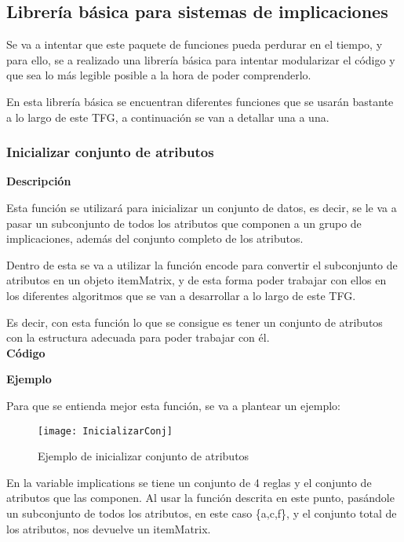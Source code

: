 \subsection{Librer\'ia b\'asica para sistemas de implicaciones}
Se va a intentar que este paquete de funciones pueda perdurar en el tiempo, y para ello, 
se a realizado una librer\'ia b\'asica para intentar modularizar el c\'odigo y que sea lo 
m\'as legible posible a la hora de poder comprenderlo.

En esta librer\'ia b\'asica se encuentran diferentes funciones que se usar\'an bastante a lo largo de este TFG, a continuaci\'on 
se van a detallar una a una.




\subsubsection{Inicializar conjunto de atributos}

    \textbf{Descripci\'on}

    Esta funci\'on se utilizar\'a para inicializar un conjunto de datos, es decir, se le va a pasar un subconjunto 
    de todos los atributos que componen a un grupo de implicaciones, adem\'as del conjunto completo de los atributos. 
    
    Dentro de esta se va a utilizar la funci\'on encode para convertir el subconjunto de atributos en un objeto itemMatrix, y de esta 
    forma poder trabajar con ellos en los diferentes algoritmos que se van a desarrollar a lo largo de este TFG.

    Es decir, con esta funci\'on lo que se consigue es tener un conjunto de atributos con la estructura adecuada para poder trabajar con \'el.
    \\

    
    \textbf{C\'odigo}
    
    
    
    
    \textbf{Ejemplo}

    Para que se entienda mejor esta funci\'on, se va a plantear un ejemplo:

    \begin{figure}[H]
        \centering
        \texttt{[image: InicializarConj]}
        \caption{Ejemplo de inicializar conjunto de atributos}
        \label{fig:InicializarConj}
    \end{figure}

    En la variable implications se tiene un conjunto de 4 reglas y el conjunto de atributos que las componen.
    Al usar la funci\'on descrita en este punto, pas\'andole un subconjunto de todos los atributos, en este caso \{a,c,f\}, y 
    el conjunto total de los atributos, nos devuelve un itemMatrix. 
    
